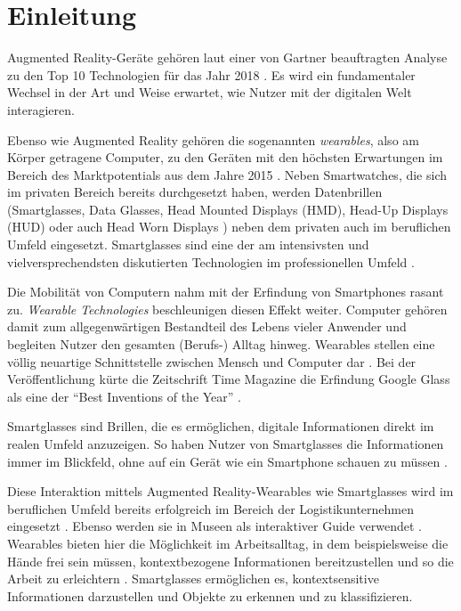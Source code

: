 %
%
%
%
%
%
\chapter{Einleitung}
\label{ch:Einleitung}
Augmented Reality-Geräte gehören laut einer von Gartner beauftragten Analyse \cite{Linden2003} zu den Top 10 Technologien für das Jahr 2018 \cite{Panetta2017a}. Es wird ein fundamentaler Wechsel in der Art und Weise erwartet, wie Nutzer mit der digitalen Welt interagieren. 

Ebenso wie Augmented Reality gehören die sogenannten \emph{wearables}, also am Körper getragene Computer, zu den Geräten mit den höchsten Erwartungen im Bereich des Marktpotentials aus dem Jahre 2015 \cite{Levy2015}. Neben Smartwatches, die sich im privaten Bereich bereits durchgesetzt haben, werden Datenbrillen (Smartglasses, Data Glasses, Head Mounted Displays (HMD), Head-Up Displays (HUD) oder auch Head Worn Displays \cite{Zobel2016}) neben dem privaten auch im beruflichen Umfeld eingesetzt. Smartglasses sind eine der am intensivsten und vielversprechendsten diskutierten Technologien im professionellen Umfeld \cite{Hein2016}.

Die Mobilität von Computern nahm mit der Erfindung von Smartphones rasant zu. \emph{Wearable Technologies} beschleunigen diesen Effekt weiter. Computer gehören damit zum allgegenwärtigen Bestandteil des Lebens vieler Anwender und begleiten Nutzer den gesamten (Berufs-) Alltag hinweg. Wearables stellen eine völlig neuartige Schnittstelle zwischen Mensch und Computer dar \cite[S.~25f]{Schwenke2016}. Bei der Veröffentlichung kürte die Zeitschrift Time Magazine die Erfindung Google Glass als eine der \enquote{Best Inventions of the Year} \cite{Bilton2015}.

Smartglasses sind Brillen, die es ermöglichen, digitale Informationen direkt im realen Umfeld anzuzeigen. So haben Nutzer von Smartglasses die Informationen immer im Blickfeld, ohne auf ein Gerät wie ein Smartphone schauen zu müssen \cite{Due2014Glasses}.

Diese Interaktion mittels Augmented Reality-Wearables wie Smartglasses wird im beruflichen Umfeld bereits erfolgreich im Bereich der Logistikunternehmen eingesetzt \cite{Plutz}.
Ebenso werden sie in Museen als interaktiver Guide verwendet \cite{Hein2016}. 
Wearables bieten hier die Möglichkeit im Arbeitsalltag, in dem beispielsweise die Hände frei sein müssen, kontextbezogene Informationen bereitzustellen und so die Arbeit zu erleichtern \cite{Zobel2016}. Smartglasses ermöglichen es, kontextsensitive Informationen darzustellen und Objekte zu erkennen und zu klassifizieren.
%

